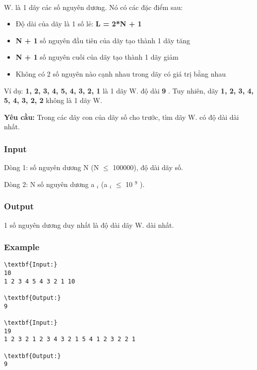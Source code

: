 

 

W. là 1 dãy các số nguyên dương. Nó có các đặc điểm sau:
\begin{itemize}
	\item Độ dài của dãy là 1 số lẻ: \textbf{ L = 2*N + 1 }
	\item \textbf{N + 1 } số nguyên đầu tiên của dãy tạo thành 1 dãy tăng
	\item \textbf{N + 1 } số nguyên cuối của dãy tạo thành 1 dãy giảm
	\item Không có 2 số nguyên nào cạnh nhau trong dãy có giá trị bằng nhau
\end{itemize}

Ví dụ: \textbf{ 1, 2, 3, 4, 5, 4, 3, 2, 1 } là 1 dãy W. độ dài \textbf{ 9 } . Tuy nhiên, dãy \textbf{ 1, 2, 3, 4, 5, 4, 3, 2, 2 } không là 1 dãy W.

\textbf{Yêu cầu: } Trong các dãy con của dãy số cho trước, tìm dãy W. có độ dài dài nhất.

\subsubsection{Input}

Dòng 1: số nguyên dương N (N  $\le$  100000), độ dài dãy số.

Dòng 2: N số nguyên dương a $_ i $ (a $_ i $  $\le$  10 $^ 9 $ ).

\subsubsection{Output}

1 số nguyên dương duy nhất là độ dài dãy W. dài nhất.

\subsubsection{Example}
\begin{verbatim}
\textbf{Input:}
10
1 2 3 4 5 4 3 2 1 10

\textbf{Output:}
9

\textbf{Input:}
19
1 2 3 2 1 2 3 4 3 2 1 5 4 1 2 3 2 2 1

\textbf{Output:}
9\end{verbatim}
